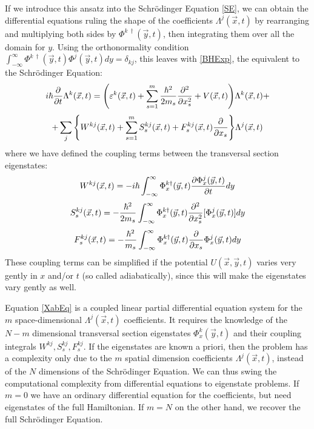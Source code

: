 \documentclass[11pt, a4paper]{article} %
\begin{document}
If we introduce this ansatz into the Schrödinger Equation \eqref{SE}, we can obtain the differential equations ruling the shape of the coefficients $\Lambda^j(\vec{x},t)$ by rearranging and multiplying both sides by $\Phi^{k\ \dagger}(\vec{y},t)$, then integrating them over all the domain for $y$. Using the orthonormality condition $\int_{-\infty}^{\infty}\Phi^{k\ \dagger}(\vec{y},t) \Phi^{j}(\vec{y},t) dy= \delta_{kj}$, this leaves with \eqref{BHExp}, the equivalent to the Schrödinger Equation:
\begin{equation}\label{XabEq}
i\hbar \pdv{}{t}\Lambda^k(\vec{x},t) = \qty( \varepsilon^k(\vec{x},t) + \sum_{s=1}^m\frac{\hbar^2}{2m_s}\pdv[2]{}{x_s}+V(\vec{x},t))\Lambda^k(\vec{x},t)+
\end{equation}
$$
 +\sum_j \qty{ W^{kj}(\vec{x},t) + \sum_{s=1}^m S^{kj}_s(\vec{x},t)+F^{kj}_s(\vec{x},t)\pdv{}{x_s} } \Lambda^j(\vec{x},t) 
$$
where we have defined the coupling terms between the transversal section eigenstates:
\begin{equation}
W^{kj}(\vec{x},t) = -i\hbar\int_{-\infty}^{\infty}\Phi_x^{k\dagger}(\vec{y},t) \pdv{\Phi^j_x(\vec{y},t)}{t} dy
\end{equation}
\begin{equation}\label{S}
S^{kj}_s(\vec{x},t) = -\frac{\hbar^2}{2m_s}\int_{-\infty}^{\infty}\Phi_x^{k\dagger}(\vec{y},t) \pdv[2]{}{x_s} [\Phi^j_x(\vec{y},t)] dy
\end{equation}
\begin{equation}\label{F}
F^{kj}_s(\vec{x},t) = -\frac{\hbar^2}{m_s}\int_{-\infty}^{\infty}\Phi_x^{k\dagger}(\vec{y},t) \pdv{}{x_s}\Phi^j_x(\vec{y},t) dy
\end{equation}
These coupling terms can be simplified if the potential $U(\vec{x},\vec{y},t)$ varies very gently in $x$ and/or $t$ (so called adiabatically), since this will make the eigenstates vary gently as well.

Equation \eqref{XabEq} is a coupled linear partial differential equation system for the $m$ space-dimensional $\Lambda^j(\vec{x},t)$ coefficients. It requires the knowledge of the $N-m$ dimensional transversal section eigenstates $\Phi^k_x(\vec{y},t)$ and their coupling integrals $W^{kj}, S^{kj}_s, F^{kj}_s$.  If the eigenstates are known a priori, then the problem has a complexity only due to the $m$ spatial dimension coefficients $\Lambda^j(\vec{x},t)$, instead of the $N$ dimensions of the Schrödinger Equation. We can thus swing the computational complexity from differential equations to eigenstate problems. If $m=0$ we have an ordinary differential equation for the coefficients, but need eigenstates of the full Hamiltonian. If $m=N$ on the other hand, we recover the full Schrödinger Equation.
\vspace{-0.3cm}
\end{document}
